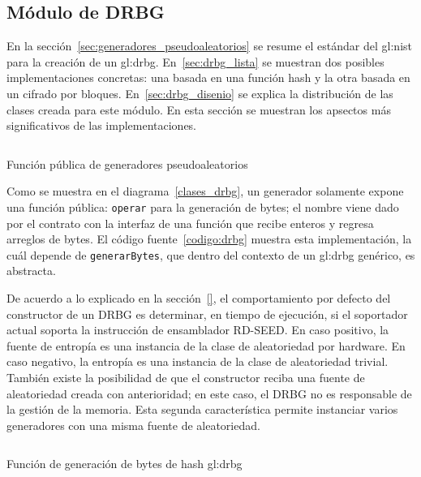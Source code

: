 %
%
%

\subsection{Módulo de DRBG}
\label{sec:implementacion_drbg}

En la sección~\ref{sec:generadores_pseudoaleatorios} se resume el estándar del
\gls{gl:nist} para la  creación de un \gls{gl:drbg}. En~\ref{sec:drbg_lista} se
muestran dos posibles implementaciones concretas: una basada en una función
hash y la  otra basada en un cifrado por bloques. En~\ref{sec:drbg_disenio} se
explica la distribución de las clases creada para este módulo. En esta sección
se muestran los apsectos más significativos de las implementaciones.

\begin{listing}
  \inputminted[firstline=66, lastline=90]
    {c++}{../implementaciones/drbg/drbg.cpp}
  \caption{Función pública de generadores pseudoaleatorios}
  \label{codigo:drbg}
\end{listing}

Como se muestra en el diagrama~\ref{clases_drbg}, un generador solamente
expone una función pública: \texttt{operar} para la generación de bytes; el
nombre viene dado por el contrato con la interfaz de una función que
recibe enteros y regresa arreglos de bytes. El código fuente~\ref{codigo:drbg}
muestra esta implementación, la cuál depende de \texttt{generarBytes}, que
dentro del contexto de un \gls{gl:drbg} genérico, es abstracta.

De acuerdo a lo explicado en la sección~\ref{}, el comportamiento por defecto del constructor de un DRBG es determinar, en tiempo de ejecución, si el soportador actual soporta la instrucción de ensamblador RD-SEED. En caso positivo, la fuente de entropía es una instancia de la clase de aleatoriedad por hardware. En caso negativo, la entropía es una instancia de la clase de aleatoriedad trivial. También existe la posibilidad de que el constructor reciba una fuente de aleatoriedad creada con anterioridad; en este caso, el DRBG no es responsable de la gestión de la memoria. Esta segunda característica permite instanciar varios generadores con una misma fuente de aleatoriedad.

\begin{listing}
  \inputminted[firstline=117, lastline=135]
    {c++}{../implementaciones/drbg/hash_drbg.cpp}
  \caption{Función de generación de bytes de hash \gls{gl:drbg}}
  \label{codigo:hash_drbg_uno}
\end{listing}

